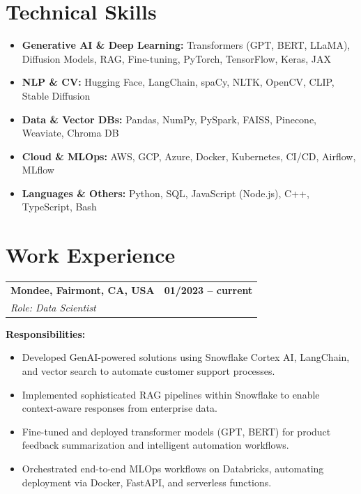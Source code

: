 \documentclass[11pt,letterpaper]{article}
\begin{document}
\vspace{-8pt}
\section*{Technical Skills}
\vspace{-6pt}

\begin{itemize}
  \item \textbf{Generative AI \& Deep Learning:} Transformers (GPT, BERT, LLaMA), Diffusion Models, RAG, Fine-tuning, PyTorch, TensorFlow, Keras, JAX
  \item \textbf{NLP \& CV:} Hugging Face, LangChain, spaCy, NLTK, OpenCV, CLIP, Stable Diffusion
  \item \textbf{Data \& Vector DBs:} Pandas, NumPy, PySpark, FAISS, Pinecone, Weaviate, Chroma DB
  \item \textbf{Cloud \& MLOps:} AWS, GCP, Azure, Docker, Kubernetes, CI/CD, Airflow, MLflow
  \item \textbf{Languages \& Others:} Python, SQL, JavaScript (Node.js), C++, TypeScript, Bash
\end{itemize}

\vspace{-8pt}
\section*{Work Experience}
\vspace{-6pt}

\noindent
\begin{tabularx}{\linewidth}{@{}X r@{}}
  \textbf{Mondee, Fairmont, CA, USA} & \textbf{01/2023 -- current}\\
  \textit{Role: Data Scientist} &
\end{tabularx}

\textbf{Responsibilities:}
\begin{itemize}
  \item Developed GenAI-powered solutions using Snowflake Cortex AI, LangChain, and vector search to automate customer support processes.
  \item Implemented sophisticated RAG pipelines within Snowflake to enable context-aware responses from enterprise data.
  \item Fine-tuned and deployed transformer models (GPT, BERT) for product feedback summarization and intelligent automation workflows.
  \item Orchestrated end-to-end MLOps workflows on Databricks, automating deployment via Docker, FastAPI, and serverless functions.
\end{itemize}
\end{document}
